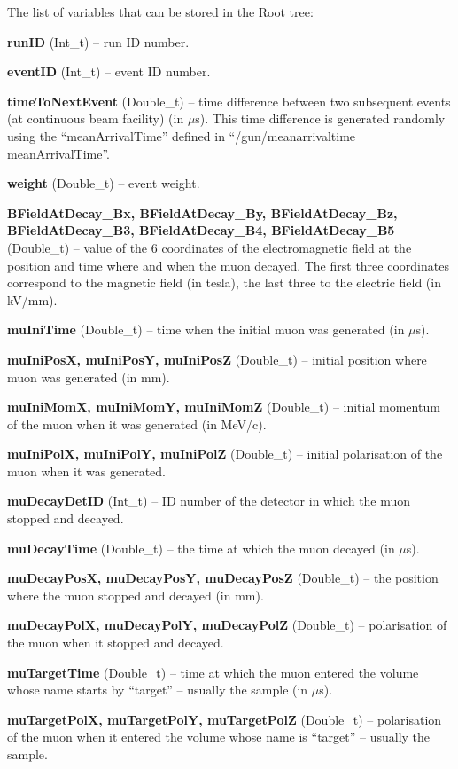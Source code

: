 \documentclass[twoside]{dis04}
\begin{document}
The list of variables that can be stored in the Root tree:
\begin{description}
\item{\bf runID} (Int\_t) -- run ID number.        
\item{\bf eventID} (Int\_t) -- event ID number.
\item{\bf timeToNextEvent} (Double\_t) -- time difference between two subsequent events (at continuous beam facility) (in $\mu$s).
        This time difference is generated randomly using the ``meanArrivalTime'' defined in ``/gun/meanarrivaltime meanArrivalTime''.
\item{\bf weight} (Double\_t) -- event weight.
\item{\bf BFieldAtDecay\_Bx, BFieldAtDecay\_By, BFieldAtDecay\_Bz, BFieldAtDecay\_B3, BFieldAtDecay\_B4, BFieldAtDecay\_B5} (Double\_t) --
	value of the 6 coordinates of the electromagnetic field at the position and time where and when the muon decayed.
        The first three coordinates correspond to the magnetic field (in tesla), the last three to the electric field
	(in kV/mm).
\item{\bf muIniTime} (Double\_t) -- time when the initial muon was generated (in $\mu$s).
\item{\bf muIniPosX, muIniPosY, muIniPosZ}  (Double\_t) -- initial position where muon was generated (in mm).
\item{\bf muIniMomX, muIniMomY, muIniMomZ}  (Double\_t) -- initial momentum of the muon when it was generated (in MeV/c).
\item{\bf muIniPolX, muIniPolY, muIniPolZ}  (Double\_t) -- initial polarisation of the muon when it was generated.
\item{\bf muDecayDetID} (Int\_t) -- ID number of the detector in which the muon stopped and decayed.
\item{\bf muDecayTime} (Double\_t) -- the time at which the muon decayed (in $\mu$s).
\item{\bf muDecayPosX, muDecayPosY, muDecayPosZ}  (Double\_t) -- the position where the muon stopped and decayed (in mm).
\item{\bf muDecayPolX, muDecayPolY, muDecayPolZ}  (Double\_t) -- polarisation of the muon when it stopped and decayed.
\item{\bf muTargetTime}  (Double\_t) -- time at which the muon entered the volume whose name starts by ``target'' -- usually the sample (in $\mu$s).
\item{\bf muTargetPolX, muTargetPolY, muTargetPolZ} (Double\_t) -- polarisation of the muon when it entered the volume whose name is ``target'' -- usually the sample.

\end{description}
\end{document}
